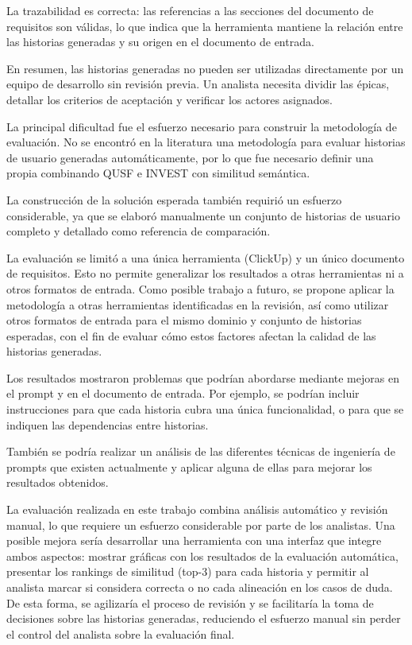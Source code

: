 La trazabilidad es correcta: las referencias a las secciones del documento de requisitos son válidas, lo que indica que la herramienta mantiene la relación entre las historias generadas y su origen en el documento de entrada.

En resumen, las historias generadas no pueden ser utilizadas directamente por un equipo de desarrollo sin revisión previa. Un analista necesita dividir las épicas, detallar los criterios de aceptación y verificar los actores asignados.

La principal dificultad fue el esfuerzo necesario para construir la metodología de evaluación. No se encontró en la literatura una metodología para evaluar historias de usuario generadas automáticamente, por lo que fue necesario definir una propia combinando QUSF e INVEST con similitud semántica.

La construcción de la solución esperada también requirió un esfuerzo considerable, ya que se elaboró manualmente un conjunto de historias de usuario completo y detallado como referencia de comparación.

La evaluación se limitó a una única herramienta (ClickUp) y un único documento de requisitos. Esto no permite generalizar los resultados a otras herramientas ni a otros formatos de entrada. Como posible trabajo a futuro, se propone aplicar la metodología a otras herramientas identificadas en la revisión, así como utilizar otros formatos de entrada para el mismo dominio y conjunto de historias esperadas, con el fin de evaluar cómo estos factores afectan la calidad de las historias generadas.

Los resultados mostraron problemas que podrían abordarse mediante mejoras en el prompt y en el documento de entrada. Por ejemplo, se podrían incluir instrucciones para que cada historia cubra una única funcionalidad, o para que se indiquen las dependencias entre historias.

También se podría realizar un análisis de las diferentes técnicas de ingeniería de prompts que existen actualmente y aplicar alguna de ellas para mejorar los resultados obtenidos.

La evaluación realizada en este trabajo combina análisis automático y revisión manual, lo que requiere un esfuerzo considerable por parte de los analistas. Una posible mejora sería desarrollar una herramienta con una interfaz que integre ambos aspectos: mostrar gráficas con los resultados de la evaluación automática, presentar los rankings de similitud (top-3) para cada historia y permitir al analista marcar si considera correcta o no cada alineación en los casos de duda. De esta forma, se agilizaría el proceso de revisión y se facilitaría la toma de decisiones sobre las historias generadas, reduciendo el esfuerzo manual sin perder el control del analista sobre la evaluación final.